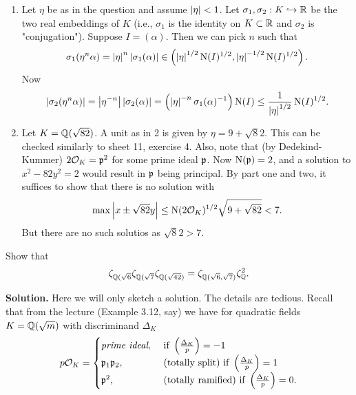 \documentclass[a4paper,11pt]{article}
\begin{document}
\begin{enumerate}[wide, labelindent=0pt]
    \item Let $\eta$ be as in the question and assume $\left\lvert \eta \right\rvert < 1$. Let
        $\sigma_1, \sigma_2: K \hookrightarrow \mathbb{R}$ be the two real embeddings of $K$ (i.e., 
        $\sigma_1$ is the identity on $K \subset \mathbb{R}$ and $\sigma_2$ is "conjugation").
        Suppose $I = (\alpha)$. Then we can pick $n$ such that 
        \begin{equation*}
            \sigma_1(\eta^n \alpha) = \left\lvert \eta \right\rvert^n \left\lvert \sigma_1(\alpha) \right\rvert
            \in \left(\left\lvert \eta \right\rvert^{1/2} \operatorname{N}(I)^{1/2}, \left\lvert \eta \right\rvert^{-1/2}
            \operatorname{N}(I)^{1/2}\right).
        \end{equation*}
        Now 
        \begin{equation*}
            \left\lvert \sigma_2(\eta^n \alpha) \right\rvert = \left\lvert \eta^{-n} \right\rvert \left\lvert \sigma_2(\alpha) \right\rvert
            = \left( \left\lvert \eta \right\rvert^{-n} \sigma_1(\alpha)^{-1} \right) \operatorname{N}(I)
                \leq \frac 1{\left\lvert \eta \right\rvert^{1/2}} \operatorname{N}(I)^{1/2}.
        \end{equation*}

    \item Let $K = \mathbb{Q}(\sqrt {82})$. A unit as in 2 is given by $\eta = 9 + \sqrt 82$. 
        This can be checked similarly to sheet 11, exercise 4. 
        Also, note that (by Dedekind-Kummer) $2 \mathcal{O}_K= \mathfrak{p}^2$ for some prime
        ideal $\mathfrak{p}$. Now $\operatorname{N}(\mathfrak{p})=2$, and a solution to $x^2 - 82y^2 = 2$
        would result in $\mathfrak{p}$ being principal. 
        By part one and two, it suffices to show that there is no solution with
        $$\max \left\lvert x \pm \sqrt {82} y \right\rvert \leq \operatorname{N}(2 \mathcal{O}_K)^{1/2} \sqrt{9 + \sqrt{82}}
        < 7.$$
        But there are no such solutios as $\sqrt 82 > 7$. 
\end{enumerate}


Show that 
\begin{equation*}
    \zeta_{\mathbb{Q}(\sqrt 6} \zeta_{\mathbb{Q}(\sqrt 7} \zeta_{\mathbb{Q}(\sqrt {42})} 
    = \zeta_{\mathbb{Q}(\sqrt 6, \sqrt 7)} \zeta_{\mathbb{Q}}^2.
\end{equation*}

\textbf{Solution.} 
Here we will only sketch a solution. The details are tedious.
Recall that from the lecture (Example 3.12, say) we have for quadratic fields
$K = \mathbb{Q}(\sqrt m)$ with discriminand $\Delta_K$
\begin{equation*}
    p\mathcal{O}_K = 
    \begin{cases}
        \textit{prime ideal}, &\text{ if } \left( \frac{\Delta_K}{p} \right) = -1 \\
        \mathfrak{p}_1 \mathfrak{p}_2, &\text{ (totally split) if } \left( \frac{\Delta_K}{p} \right) = 1 \\
        \mathfrak{p}^2, &\text{ (totally ramified) if } \left( \frac{\Delta_K}{p} \right) = 0.
    \end{cases}
\end{equation*}
\end{document}
